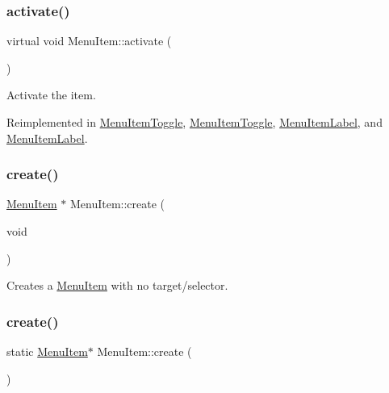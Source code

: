 \subsubsection{\texorpdfstring{activate()}{activate()}\hspace{0.1cm}{\footnotesize\ttfamily [2/2]}}
{\footnotesize\ttfamily virtual void Menu\+Item\+::activate (\begin{DoxyParamCaption}{ }\end{DoxyParamCaption})\hspace{0.3cm}{\ttfamily [virtual]}}

Activate the item. 

Reimplemented in \hyperlink{classMenuItemToggle_a39fc9a7827cfe809858f39f6bce8a3e7}{Menu\+Item\+Toggle}, \hyperlink{classMenuItemToggle_a565753be8b77ee82cb1ec98f21924d49}{Menu\+Item\+Toggle}, \hyperlink{classMenuItemLabel_a6a5e8b0d94a07126c084ec1ba1695c13}{Menu\+Item\+Label}, and \hyperlink{classMenuItemLabel_a03b829211e9bf837d6e2febc1bee290c}{Menu\+Item\+Label}.

\mbox{\label{classMenuItem_a241257e98f27222a37ea03e40971c066}} 
\subsubsection{\texorpdfstring{create()}{create()}\hspace{0.1cm}{\footnotesize\ttfamily [1/6]}}
{\footnotesize\ttfamily \hyperlink{classMenuItem}{Menu\+Item} $\ast$ Menu\+Item\+::create (\begin{DoxyParamCaption}\item[{void}]{ }\end{DoxyParamCaption})\hspace{0.3cm}{\ttfamily [static]}}

Creates a \hyperlink{classMenuItem}{Menu\+Item} with no target/selector. \mbox{\label{classMenuItem_a2b8f48a8ba454d73ecd6ee74a0486a00}} 
\subsubsection{\texorpdfstring{create()}{create()}\hspace{0.1cm}{\footnotesize\ttfamily [2/6]}}
{\footnotesize\ttfamily static \hyperlink{classMenuItem}{Menu\+Item}$\ast$ Menu\+Item\+::create (\begin{DoxyParamCaption}{ }\end{DoxyParamCaption})\hspace{0.3cm}{\ttfamily [static]}}

